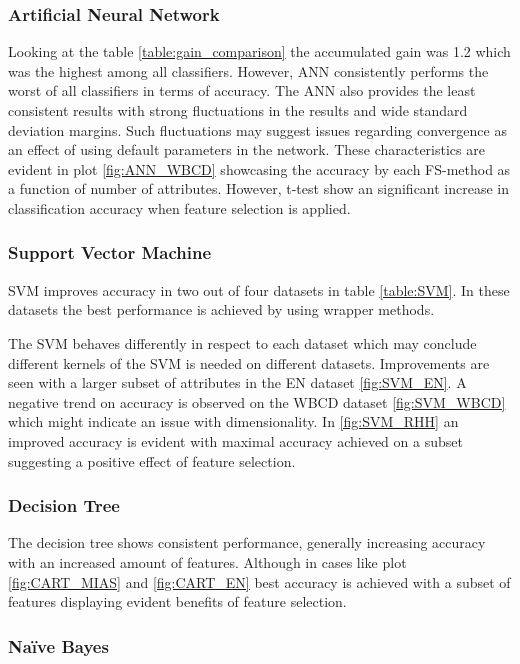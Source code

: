 \subsubsection{Artificial Neural Network}

Looking at the table \ref{table:gain_comparison} the accumulated gain was 1.2 which was the highest among all classifiers. However, ANN consistently performs the worst of all classifiers in terms of accuracy. The ANN also provides the least consistent results with strong fluctuations in the results and wide standard deviation margins. Such fluctuations may suggest issues regarding convergence as an effect of using default parameters in the network. These characteristics are evident in plot \ref{fig:ANN_WBCD} showcasing the accuracy by each FS-method as a function of number of attributes. However, t-test show an significant increase in classification accuracy when feature selection is applied.

\subsubsection{Support Vector Machine}

SVM improves accuracy in two out of four datasets in table \ref{table:SVM}. In these datasets the best performance is achieved by using wrapper methods.

The SVM behaves differently in respect to each dataset which may conclude different kernels of the SVM is needed on different datasets. Improvements are seen with a larger subset of attributes in the EN dataset \ref{fig:SVM_EN}. A negative trend on accuracy is observed on the WBCD dataset \ref{fig:SVM_WBCD} which might indicate an issue with dimensionality. In \ref{fig:SVM_RHH} an improved accuracy is evident with maximal accuracy achieved on a subset suggesting a positive effect of feature selection.

\subsubsection{Decision Tree}

The decision tree shows consistent performance, generally increasing accuracy with an increased amount of features. Although in cases like plot \ref{fig:CART_MIAS} and \ref{fig:CART_EN} best accuracy is achieved with a subset of features displaying evident benefits of feature selection.

\subsubsection{Naïve Bayes}

